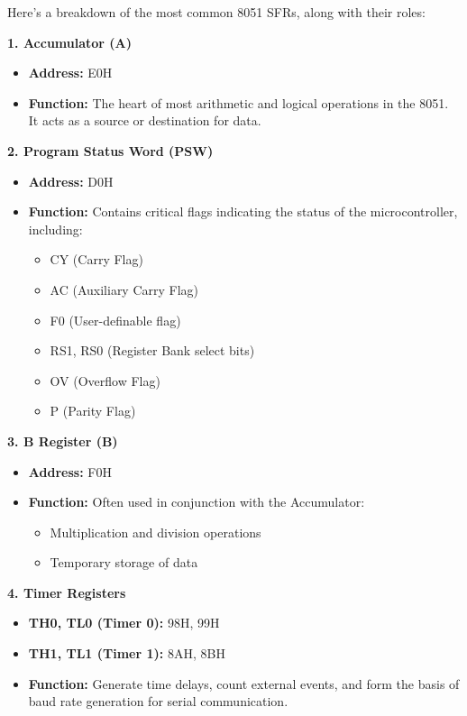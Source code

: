 \documentclass[
]{article}
\begin{document}
Here's a breakdown of the most common 8051 SFRs, along with their roles:

\textbf{1. Accumulator (A)}

\begin{itemize}
\item
  \textbf{Address:} E0H
\item
  \textbf{Function:} The heart of most arithmetic and logical operations
  in the 8051. It acts as a source or destination for data.
\end{itemize}

\textbf{2. Program Status Word (PSW)}

\begin{itemize}
\item
  \textbf{Address:} D0H
\item
  \textbf{Function:} Contains critical flags indicating the status of
  the microcontroller, including:

  \begin{itemize}
  \item
    CY (Carry Flag)
  \item
    AC (Auxiliary Carry Flag)
  \item
    F0 (User-definable flag)
  \item
    RS1, RS0 (Register Bank select bits)
  \item
    OV (Overflow Flag)
  \item
    P (Parity Flag)
  \end{itemize}
\end{itemize}

\textbf{3. B Register (B)}

\begin{itemize}
\item
  \textbf{Address:} F0H
\item
  \textbf{Function:} Often used in conjunction with the Accumulator:

  \begin{itemize}
  \item
    Multiplication and division operations
  \item
    Temporary storage of data
  \end{itemize}
\end{itemize}

\textbf{4. Timer Registers}

\begin{itemize}
\item
  \textbf{TH0, TL0 (Timer 0):} 98H, 99H
\item
  \textbf{TH1, TL1 (Timer 1):} 8AH, 8BH
\item
  \textbf{Function:} Generate time delays, count external events, and
  form the basis of baud rate generation for serial communication.
\end{itemize}
\end{document}
